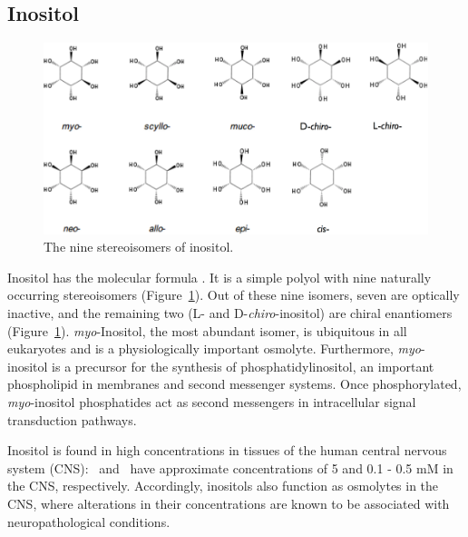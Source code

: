 \subsection{Inositol}
\begin{figure}
	\centering
	\includegraphics[width=5in]{figures/introduction/inositol.pdf}
	\caption[Inositol stereoisomers]{The nine stereoisomers of inositol.}
	\label{fig:inositols}
\end{figure}

Inositol has the molecular formula . It is a simple polyol with nine naturally occurring stereoisomers (Figure~\ref{fig:inositols}).\cite{Fisher:2002tk} Out of these nine isomers, seven are optically inactive, and the remaining two (L- and D-\emph{chiro}-inositol) are chiral enantiomers (Figure~\ref{fig:inositols}).\cite{Fisher:2002tk} \emph{myo}-Inositol, the most abundant isomer, is ubiquitous in all eukaryotes and is a physiologically important osmolyte. \cite{Fisher:2002tk} Furthermore, \emph{myo}-inositol is a precursor for the synthesis of phosphatidylinositol, an important phospholipid in membranes and second messenger systems.\cite{Fisher:2002tk} Once phosphorylated, \emph{myo}-inositol phosphatides act as second messengers in intracellular signal transduction pathways.\cite{Fisher:2002tk} 

Inositol is found in high concentrations in tissues of the human central nervous system (CNS): \myo\ and \scylloi\ have approximate concentrations of 5 and 0.1 - 0.5 mM in the CNS, respectively.\cite{Fisher:2002tk} Accordingly, inositols also function as osmolytes in the CNS, where alterations in their concentrations are known to be associated with neuropathological conditions.\cite{Michaelis:1993gf, Fisher:2002tk}

